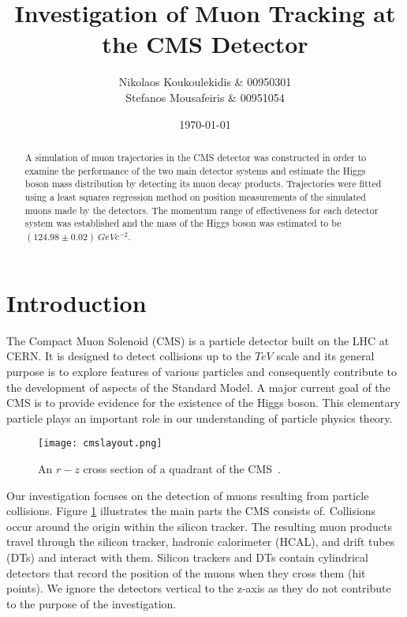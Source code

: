 \documentclass{article}
\title{Investigation of Muon Tracking at the CMS Detector}
\author{Nikolaos Koukoulekidis \& 00950301 \\ Stefanos Mousafeiris \& 00951054}
\date{\today}
\begin{document}
\maketitle


\begin{abstract}

A simulation of muon trajectories in the CMS detector was constructed in order to examine the performance of the two main detector systems and estimate the Higgs boson mass distribution by detecting its muon decay products. Trajectories were fitted using a least squares regression method on position measurements of the simulated muons made by the detectors. The momentum range of effectiveness for each detector system was established and the mass of the Higgs boson was estimated to be $(124.98\pm0.02)\ GeVc^{-2}$.
\end{abstract}

\section*{Introduction}

The Compact Muon Solenoid (CMS) is a particle detector built on the LHC at CERN. It is designed to detect collisions up to the $TeV$ scale and its general purpose is to explore features of various particles and consequently contribute to the development of aspects of the Standard Model. A major current goal of the CMS is to provide evidence for the existence of the Higgs boson. This elementary particle plays an important role in our understanding of particle physics theory.

\begin{figure}[h]
\centering
\texttt{[image: cmslayout.png]}
\caption{An $r-z$ cross section of a quadrant of the CMS~\cite{cms}.}
	\label{cmslayout}
\end{figure}

Our investigation focuses on the detection of muons resulting from particle collisions.  Figure \ref{cmslayout} illustrates the main parts the CMS consists of. Collisions occur around the origin within the silicon tracker. The resulting muon products travel through the silicon tracker, hadronic calorimeter (HCAL), and drift tubes (DTs) and interact with them. Silicon trackers and DTs contain cylindrical detectors that record the position of the muons when they cross them (hit points). We ignore the detectors vertical to the z-axis as they do not contribute to the purpose of the investigation.\\
\end{document}
